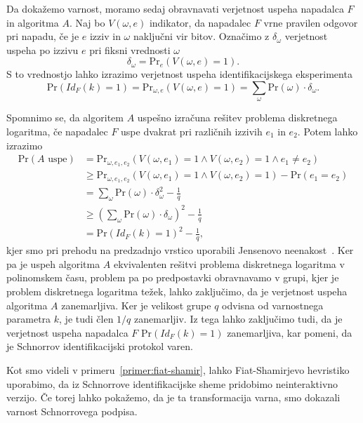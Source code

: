 \documentclass[isrm2, tisk]{fmfdelo}
\begin{document}
\begin{dokaz}
    Da dokažemo varnost, moramo sedaj obravnavati verjetnost uspeha napadalca $F$ in algoritma $A$.
    Naj bo $V(\omega, e)$ indikator, da napadalec $F$ vrne pravilen odgovor pri napadu, če je $e$ izziv
    in $\omega$ naključni vir bitov. Označimo z $\delta_{\omega}$ verjetnost uspeha po izzivu $e$
    pri fiksni vrednosti $\omega$
    $$
    \delta_{\omega} = \text{Pr}_e(V(\omega, e) = 1).
    $$
    S to vrednostjo lahko izrazimo verjetnost uspeha identifikacijskega eksperimenta
    $$
    \text{Pr}(Id_F(k) = 1) = \text{Pr}_{\omega, e}(V(\omega, e) = 1) =
        \sum_{\omega} \text{Pr}(\omega) \cdot \delta_{\omega}.
    $$

    Spomnimo se, da algoritem $A$ uspešno izračuna rešitev problema diskretnega logaritma, če napadalec
    $F$ uspe dvakrat pri različnih izzivih $e_1$ in $e_2$. Potem lahko izrazimo
    \begin{align*}
        \text{Pr}(A \text{ uspe}) &=
            \text{Pr}_{\omega, e_1, e_2}(V(\omega, e_1) = 1 \land V(\omega, e_2) = 1 \land e_1 \neq e_2) \\
                                  &\geq \text{Pr}_{\omega, e_1, e_2}(V(\omega, e_1) = 1 \land V(\omega, e_2) = 1) - \text{Pr}(e_1 = e_2) \\
                                  &= \sum_{\omega} \text{Pr}(\omega) \cdot \delta_{\omega}^2 - \frac{1}{q} \\
                                  &\geq (\sum_{\omega} \text{Pr}(\omega) \cdot \delta_{\omega})^2 - \frac{1}{q} \\
                                  &= \text{Pr}(Id_F(k) = 1)^2 - \frac{1}{q},
    \end{align*}
    kjer smo pri prehodu na predzadnjo vrstico uporabili Jensenovo neenakost~\cite{jensen}.
    Ker pa je uspeh algoritma $A$ ekvivalenten rešitvi problema diskretnega logaritma v polinomskem
    času, problem pa po predpostavki obravnavamo v grupi, kjer je problem diskretnega logaritma težek,
    lahko zaključimo, da je verjetnost uspeha algoritma $A$ zanemarljiva. Ker je velikost grupe $q$
    odvisna od varnostnega parametra $k$, je tudi člen $1/q$ zanemarljiv. Iz tega lahko zaključimo
    tudi, da je verjetnost uspeha napadalca $F$ $\text{Pr}(Id_F(k) = 1)$ zanemarljiva, kar pomeni,
    da je Schnorrov identifikacijski protokol varen.
\end{dokaz}

Kot smo videli v primeru~\ref{primer:fiat-shamir}, lahko Fiat-Shamirjevo hevristiko uporabimo, da
iz Schnorrove identifikacijske sheme pridobimo neinteraktivno verzijo. Če torej lahko pokažemo,
da je ta transformacija varna, smo dokazali varnost Schnorrovega podpisa.
\end{document}
